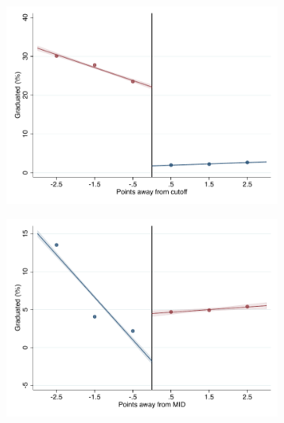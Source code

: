 \documentclass[oneside,11pt]{article}
\begin{document}
\begin{figure}[H]

    \caption{RD plots for outcome variables across those assigned to UNAM high-school, and those who are not\label{fig:ITT_rd_plot_UNAM_1}}
    \begin{center}
    
    \begin{subfigure}{0.475\textwidth}
        \centering
        \includegraphics[width=\textwidth]{04_Figures/rd_plot_tau_ENLACE_ANY_UNAM3.pdf}
    \end{subfigure}
    \begin{subfigure}{0.475\textwidth}
        \centering
        \includegraphics[width=\textwidth]{04_Figures/rd_plot_mid_ENLACE_ANY_UNAM3.pdf}
    \end{subfigure}


\end{center}
\end{figure}
\end{document}
